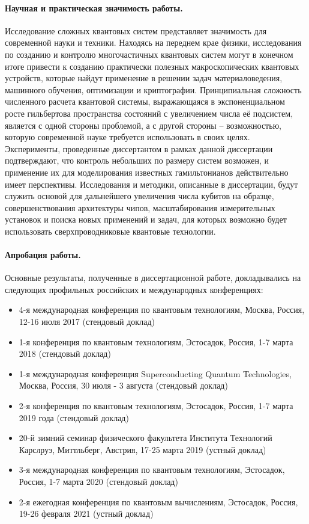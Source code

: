 \documentclass[14pt, a4paper]{extarticle}
\begin{document}
\paragraph{Научная и практическая значимость работы.} Исследование сложных квантовых систем представляет значимость для современной науки и техники. Находясь на переднем крае физики, исследования по созданию и контролю многочастичных квантовых систем могут в конечном итоге привести к созданию практически полезных макроскопических квантовых устройств, которые найдут применение в решении задач материаловедения, машинного обучения, оптимизации и криптографии. Принципиальная сложность численного расчета квантовой системы, выражающаяся в экспоненциальном росте гильбертова пространства состояний с увеличением числа её подсистем, является с одной стороны проблемой, а с другой стороны -- возможностью, которую современной науке требуется использовать в своих целях. Эксперименты, проведенные диссертантом в рамках данной диссертации подтверждают, что контроль небольших по размеру систем возможен, и применение их для моделирования известных гамильтонианов действительно имеет перспективы. Исследования и методики, описанные в диссертации, будут служить основой для дальнейшего увеличения числа кубитов на образце, совершенствования архитектуры чипов, масштабирования измерительных установок и поиска новых применений и задач, для которых возможно будет использовать сверхпроводниковые квантовые технологии.


\paragraph{Апробация работы.} Основные результаты, полученные в диссертационной работе, докладывались на следующих профильных российских и международных конференциях:
\begin{itemize}
	\item 4-я международная конференция по квантовым технологиям, Москва, Россия, 12-16 июля 2017 (стендовый доклад)
	\item 1-я конференция по квантовым технологиям, Эстосадок, Россия, 1-7 марта 2018 (стендовый доклад)
	\item 1-я международная конференция Superconducting Quantum Technologies, Москва, Россия, 30 июля - 3 августа (стендовый доклад)
	\item 2-я конференция по квантовым технологиям, Эстосадок, Россия, 1-7 марта 2019 года (стендовый доклад)
	\item 20-й зимний семинар физического факультета Института Технологий Карслруэ, Миттльберг, Австрия,  17-25 марта 2019 (устный доклад)
	\item 3-я международная конференция по квантовым технологиям, Эстосадок, Россия, 1-7 марта 2020 (стендовый доклад)
	\item 2-я ежегодная конференция по квантовым вычислениям, Эстосадок, Россия, 19-26 февраля 2021 (устный доклад)
\end{itemize}
\end{document}
